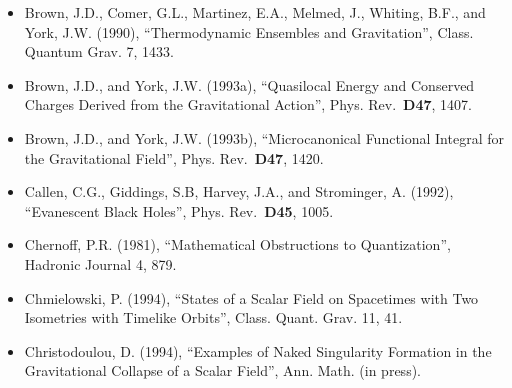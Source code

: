 \documentclass[11pt,a4paper]{article}
\begin{document}
\begin{itemize}
\item
  Brown, J.D., Comer, G.L., Martinez, E.A., Melmed, J., Whiting, B.F., and York, J.W. (1990), ``Thermodynamic Ensembles and Gravitation'', Class. Quantum Grav. 7, 1433.
\item
  Brown, J.D., and York, J.W. (1993a), ``Quasilocal Energy and Conserved Charges Derived from the Gravitational Action'', Phys. Rev.~\textbf{D47}, 1407.
\item
  Brown, J.D., and York, J.W. (1993b), ``Microcanonical Functional Integral for the Gravitational Field'', Phys. Rev.~\textbf{D47}, 1420.
\item
  Callen, C.G., Giddings, S.B, Harvey, J.A., and Strominger, A. (1992), ``Evanescent Black Holes'', Phys. Rev.~\textbf{D45}, 1005.
\item
  Chernoff, P.R. (1981), ``Mathematical Obstructions to Quantization'', Hadronic Journal 4, 879.
\item
  Chmielowski, P. (1994), ``States of a Scalar Field on Spacetimes with Two Isometries with Timelike Orbits'', Class. Quant. Grav. 11, 41.
\item
  Christodoulou, D. (1994), ``Examples of Naked Singularity Formation in the Gravitational Collapse of a Scalar Field'', Ann. Math. (in press).
\end{itemize}

\hypertarget{source-209}{}
\end{document}

